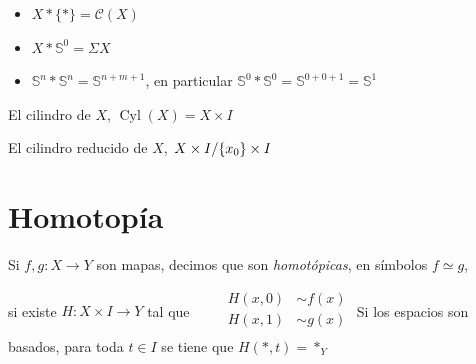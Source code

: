 \begin{tcolorbox}
    \begin{itemize}[noitemsep, topsep=0pt]
        \item[] \(X\ast\{\ast\}=\mathcal{C}(X)\)
        \item[] \(X\ast \mathbb{S}^{0}=\Sigma X\)
        \item[] \(\mathbb{S}^{n}\ast\mathbb{S}^{n}=\mathbb{S}^{n+m+1}\), en particular \(\mathbb{S}^{0}\ast\mathbb{S}^{0}=\mathbb{S}^{0+0+1}=\mathbb{S}^{1}\)
    \end{itemize}
\end{tcolorbox}

\begin{tcolorbox}[colback=blue-violet!5!white,colframe=blue-violet!75!black,title=\textbf{Definición}.\index{cilindro}]
    \begin{center}
        El cilindro de \(X\), \(\operatorname{Cyl}(X)=X\times I\)
    \end{center}
\end{tcolorbox}  

\begin{tcolorbox}[colback=blue-violet!5!white,colframe=blue-violet!75!black,title=\textbf{Definición}.\index{cilindro reducido}]
    \begin{center}
        El cilindro reducido de \(X\), \(\left.X\times I\middle/\{x_0\}\times I\right.\)
    \end{center}
\end{tcolorbox}  

\newpage
\section*{Homotopía}
\begin{tcolorbox}[colback=blue-violet!5!white,colframe=blue-violet!75!black,title=\textbf{Definición}.\index{mapas homotópicos, funciones homotópicas}]
    Si \(f, g\colon X\to Y\) son mapas, decimos que son \textit{homotópicas}, en símbolos \(f\simeq g\), 
    
    si existe \(H\colon X\times I \to Y\) tal que 
    \(\qquad 
    \begin{aligned}
        H(x, 0)&\sim f(x)\\[-3pt]
        H(x, 1)&\sim g(x)\\
    \end{aligned}\)
\tcblower
    Si los espacios son basados, para toda \(t\in I\) se tiene que \(H(\ast, t)=\ast_{Y}\)
\end{tcolorbox}

